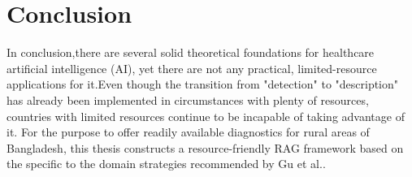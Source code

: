 
\section{Conclusion}
In conclusion,there are several solid theoretical foundations for healthcare artificial intelligence (AI), yet there are not any practical, limited-resource applications for it.Even though the transition from "detection" to "description" has already been implemented in circumstances with plenty of resources, countries with limited resources continue to be incapable of taking advantage of it. For the purpose to offer readily available diagnostics for rural areas of Bangladesh, this thesis constructs a resource-friendly RAG framework based on the specific to the domain strategies recommended by Gu et al.\cite{Gu2021}.

